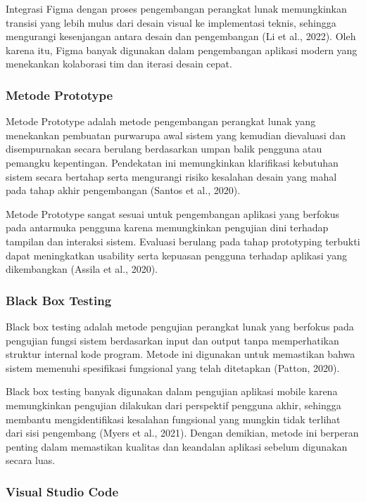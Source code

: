 Integrasi Figma dengan proses pengembangan perangkat lunak memungkinkan transisi yang lebih mulus dari desain visual ke implementasi teknis, sehingga mengurangi kesenjangan antara desain dan pengembangan (Li et al., 2022). Oleh karena itu, Figma banyak digunakan dalam pengembangan aplikasi modern yang menekankan kolaborasi tim dan iterasi desain cepat.


\subsubsection{Metode Prototype}

Metode Prototype adalah metode pengembangan perangkat lunak yang menekankan pembuatan purwarupa awal sistem yang kemudian dievaluasi dan disempurnakan secara berulang berdasarkan umpan balik pengguna atau pemangku kepentingan. Pendekatan ini memungkinkan klarifikasi kebutuhan sistem secara bertahap serta mengurangi risiko kesalahan desain yang mahal pada tahap akhir pengembangan (Santos et al., 2020).

Metode Prototype sangat sesuai untuk pengembangan aplikasi yang berfokus pada antarmuka pengguna karena memungkinkan pengujian dini terhadap tampilan dan interaksi sistem. Evaluasi berulang pada tahap prototyping terbukti dapat meningkatkan usability serta kepuasan pengguna terhadap aplikasi yang dikembangkan (Assila et al., 2020).


\subsubsection{Black Box Testing}

Black box testing adalah metode pengujian perangkat lunak yang berfokus pada pengujian fungsi sistem berdasarkan input dan output tanpa memperhatikan struktur internal kode program. Metode ini digunakan untuk memastikan bahwa sistem memenuhi spesifikasi fungsional yang telah ditetapkan (Patton, 2020).

Black box testing banyak digunakan dalam pengujian aplikasi mobile karena memungkinkan pengujian dilakukan dari perspektif pengguna akhir, sehingga membantu mengidentifikasi kesalahan fungsional yang mungkin tidak terlihat dari sisi pengembang (Myers et al., 2021). Dengan demikian, metode ini berperan penting dalam memastikan kualitas dan keandalan aplikasi sebelum digunakan secara luas.


\subsubsection{Visual Studio Code}

